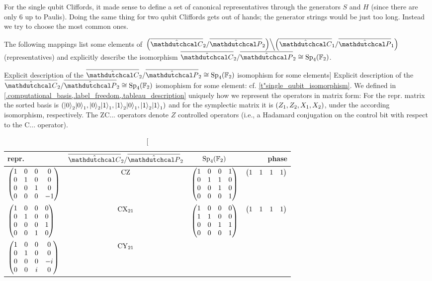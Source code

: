 \documentclass[a4paper,english]{scrartcl}
\begin{document}
\begin{remark}
For the single qubit Cliffords, it made sense to define a set of canonical
representatives through the generators $S$ and $H$ (since there are only $6$ up to
Paulis). Doing the same thing for two qubit Cliffords gets out of hands; the generator
strings would be just too long. Instead we try to choose the most common ones.
\end{remark}
\begin{proposition}
The following mappings list some elements of
$\left.\w(\ouic_2/\ouip_2)\middle\backslash\w(\ouic_1/\ouip_1)\right.$ (representatives)
and explicitly describe the isomorphism $\ouic_2/\ouip_2 \cong \Sp_{4}\w(\F_2)$.
\begin{table}[H]\label{t"two_qubit_isomorphism}
\center
\caption
[Explicit description of the $\ouic_2/\ouip_2 \cong \Sp_{4}\w(\F_2)$ isomophism for some
elements]
{Explicit description of the $\ouic_2/\ouip_2 \cong \Sp_{4}\w(\F_2)$ isomophism for some
element: cf. \cref{t"single_qubit_isomorphism}. We defined in
\cref{.computational_basis,.label_freedom,.tableau_description} uniquely how we
represent the operators in matrix form: For the repr. matrix the sorted basis is
$\w(\er{0}_2\er{0}_1, \er{0}_2\er{1}_1, \er{1}_2\er{0}_1, \er{1}_2\er{1}_1)$ and for the
symplectic matrix it is $\w(Z_1, Z_2, X_1, X_2)$, under the according isomorphism,
respectively. The $\mathrm{ZC}...$ operators denote $Z$ controlled operators (i.e., a
Hadamard conjugation on the control bit with respect to the $\mathrm{C}...$ operator).}
\begin{tabular}{lccr}
  \toprule
  repr. & $\ouic_2/\ouip_2$ & $\Sp_{4}\w(\F_2)$ & phase\\
  \midrule
  $\begin{pmatrix}1&0&0&0\\0&1&0&0\\0&0&1&0\\0&0&0&-1\end{pmatrix}$ & $\cz$ &
  $\begin{pmatrix}1&0&0&1\\0&1&1&0\\0&0&1&0\\0&0&0&1\end{pmatrix}$ & $\begin{pmatrix}1&1&1&1\end{pmatrix}$\\
  \midrule
  $\begin{pmatrix}1&0&0&0\\0&1&0&0\\0&0&0&1\\0&0&1&0\end{pmatrix}$ & $\cx_{21}$ &
  $\begin{pmatrix}1&0&0&0\\1&1&0&0\\0&0&1&1\\0&0&0&1\end{pmatrix}$ & $\begin{pmatrix}1&1&1&1\end{pmatrix}$\\
  \midrule
  $\begin{pmatrix}1&0&0&0\\0&1&0&0\\0&0&0&-i\\0&0&i&0\end{pmatrix}$ & $\cy_{21}$ &

\end{tabular}
\end{table}
\end{proposition}
\end{document}
